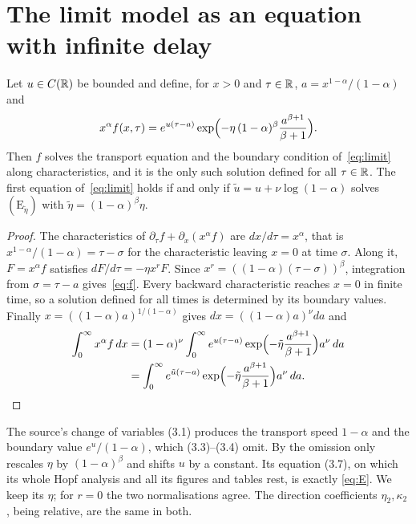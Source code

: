 \documentclass[11pt,a4paper]{report}
\begin{document}
\section{The limit model as an equation with infinite delay}\label{sec:reduction}

\begin{proposition}\label{prop:reduction}
Let $u\in C(\mathbb{R})$ be bounded and define, for $x>0$ and $\tau\in\mathbb{R}$, $a=x^{1-\alpha}/(1-\alpha)$ and
\begin{equation}\label{eq:f}
x^\alpha f(x,\tau)=e^{u(\tau-a)}\exp\Bigl(-\eta\,(1-\alpha)^\beta\frac{a^{\beta+1}}{\beta+1}\Bigr).
\end{equation}
Then $f$ solves the transport equation and the boundary condition of~\eqref{eq:limit} along characteristics, and it is the only such solution defined for all $\tau\in\mathbb{R}$. The first equation of~\eqref{eq:limit} holds if and only if $\tilde u=u+\nu\log(1-\alpha)$ solves $(\mathrm E_{\tilde\eta})$ with $\tilde\eta=(1-\alpha)^\beta\eta$.
\end{proposition}

\begin{proof}
The characteristics of $\partial_\tau f+\partial_x(x^\alpha f)$ are $dx/d\tau=x^\alpha$, that is $x^{1-\alpha}/(1-\alpha)=\tau-\sigma$ for the characteristic leaving $x=0$ at time $\sigma$. Along it, $F=x^\alpha f$ satisfies $dF/d\tau=-\eta x^rF$. Since $x^r=((1-\alpha)(\tau-\sigma))^\beta$, integration from $\sigma=\tau-a$ gives~\eqref{eq:f}. Every backward characteristic reaches $x=0$ in finite time, so a solution defined for all times is determined by its boundary values. Finally $x=((1-\alpha)a)^{1/(1-\alpha)}$ gives $dx=((1-\alpha)a)^\nu da$ and
\begin{align*}
\int_0^\infty x^\alpha f\,dx&=(1-\alpha)^\nu\int_0^\infty e^{u(\tau-a)}\exp\Bigl(-\tilde\eta\frac{a^{\beta+1}}{\beta+1}\Bigr)a^\nu\,da\\
&=\int_0^\infty e^{\tilde u(\tau-a)}\exp\Bigl(-\tilde\eta\frac{a^{\beta+1}}{\beta+1}\Bigr)a^\nu\,da.\qedhere
\end{align*}
\end{proof}

\begin{remark}[normalisation]\label{rem:normalisation}
The source's change of variables (3.1) produces the transport speed $1-\alpha$ and the boundary value $e^u/(1-\alpha)$, which (3.3)--(3.4) omit. By  the omission only rescales $\eta$ by $(1-\alpha)^\beta$ and shifts $u$ by a constant. Its equation (3.7), on which its whole Hopf analysis and all its figures and tables rest, is exactly \eqref{eq:E}. We keep its $\eta$; for $r=0$ the two normalisations agree. The direction coefficients $\eta_2,\kappa_2$, being relative, are the same in both.
\end{remark}
\end{document}
